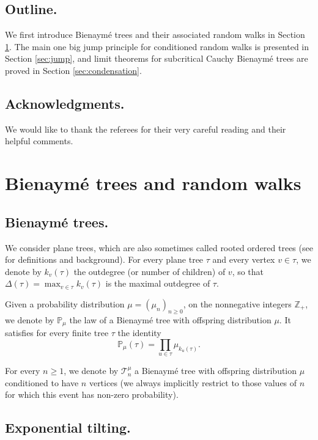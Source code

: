 \documentclass[a4paper,11pt]{article}
\DeclareRobustCommand{\P}{\mathbb{P}}
\DeclareRobustCommand{\Z}{\mathbb{Z}}
\begin{document}
    \subsection{Outline.} We first introduce Bienaymé trees and their associated random walks in Section \ref{sec:B}.  The main one big jump principle for conditioned random walks is presented in Section \ref{sec:jump}, and limit theorems for subcritical Cauchy Bienaymé trees are proved in Section \ref{sec:condensation}.

   \subsection{Acknowledgments.} We would like to thank the referees for their very careful reading and their helpful comments.
            
    \section{Bienaymé trees and random walks}
  \label{sec:B}
    
\subsection{Bienaymé trees.}            We consider plane trees, which are also sometimes called rooted ordered trees (see \cite[Sec.~1]{Le_Gall_2005} for definitions and background). For every plane tree $\tau$ and every vertex $v \in \tau$, we denote by $k_v(\tau)$ the outdegree (or number of children) of $v$, so that $\Delta(\tau)=\max_{v \in \tau} k_{v}(\tau)$ is the maximal outdegree of $\tau$.
            
            Given a probability distribution   $\mu=(\mu_{n})_{n \geq 0}$, on the nonnegative integers $\Z_{+}$, we denote by $\P_{\mu}$ the law of a Bienaymé tree with offspring distribution $\mu$. It satisfies for every finite tree $\tau$ the identity
                            $$\P_\mu(\tau) = \prod_{u\in \tau} \mu_{k_u(\tau)}.$$

For every $n \geq 1$, we denote by $ \mathcal{T}^{\mu}_{n}$ a Bienaymé tree with offspring distribution $\mu$ conditioned to have $n$ vertices (we always implicitly restrict to those values of $n$ for which this event has non-zero probability).
 
\subsection{Exponential tilting.}
\label{ssec:tilting}
\end{document}
